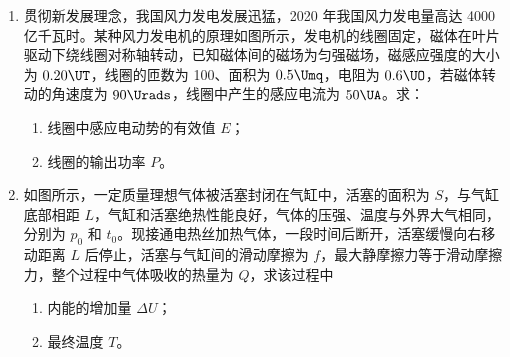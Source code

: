 \documentclass[\gkver]{gaokaozhenti}
\begin{document}
\begin{enumerate}
\item
贯彻新发展理念，我国风力发电发展迅猛，2020 年我国风力发电量高达 4000 亿千瓦时。某种风力发电机的原理如图所示，发电机的线圈固定，磁体在叶片驱动下绕线圈对称轴转动，已知磁体间的磁场为匀强磁场，磁感应强度的大小为 $0.20\UT$，线圈的匝数为 100、面积为 $0.5\Umq$，电阻为 $0.6\UO$，若磁体转动的角速度为 $90\Urads$，线圈中产生的感应电流为 $50\UA$。求：
\begin{enumerate}
	\item
	线圈中感应电动势的有效值 $E$；
	\item
	线圈的输出功率 $P$。
\end{enumerate}



\item
如图所示，一定质量理想气体被活塞封闭在气缸中，活塞的面积为 $S$，与气缸底部相距 $L$，气缸和活塞绝热性能良好，气体的压强、温度与外界大气相同，分别为 $p_{0}$ 和 $t_{0}$。现接通电热丝加热气体，一段时间后断开，活塞缓慢向右移动距离 $L$ 后停止，活塞与气缸间的滑动摩擦为 $f$，最大静摩擦力等于滑动摩擦力，整个过程中气体吸收的热量为 $Q$，求该过程中
\begin{enumerate}
	\item
	内能的增加量 $\Delta U$；
	\item
	最终温度 $T$。
\end{enumerate}


\end{enumerate}
\end{document}
